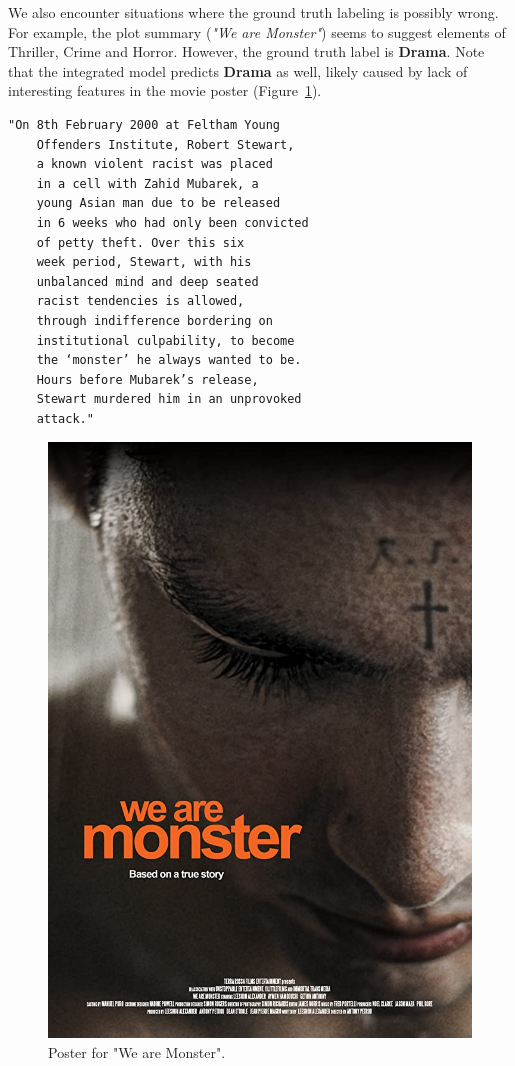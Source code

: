 \documentclass[10pt]{article}
\begin{document}
We also encounter situations where the ground truth labeling is possibly wrong. For example, the plot summary (\textit{"We are Monster"}) seems to suggest elements of Thriller, Crime and Horror. However, the ground truth label is \textbf{Drama}. Note that the integrated model predicts \textbf{Drama} as well, likely caused by lack of interesting features in the movie poster (Figure~\ref{fig:WeAreMonster}).

\begin{Verbatim}[fontsize=\small]
    "On 8th February 2000 at Feltham Young 
    Offenders Institute, Robert Stewart, 
    a known violent racist was placed 
    in a cell with Zahid Mubarek, a 
    young Asian man due to be released 
    in 6 weeks who had only been convicted
    of petty theft. Over this six 
    week period, Stewart, with his 
    unbalanced mind and deep seated 
    racist tendencies is allowed, 
    through indifference bordering on 
    institutional culpability, to become 
    the ‘monster’ he always wanted to be. 
    Hours before Mubarek’s release, 
    Stewart murdered him in an unprovoked 
    attack."
\end{Verbatim}
\begin{figure}[!h]
    \centering
    \includegraphics[scale=0.1]{images/WeAreMonster.jpg}
    \caption{Poster for "We are Monster".}
    \label{fig:WeAreMonster}
\end{figure}
\end{document}
